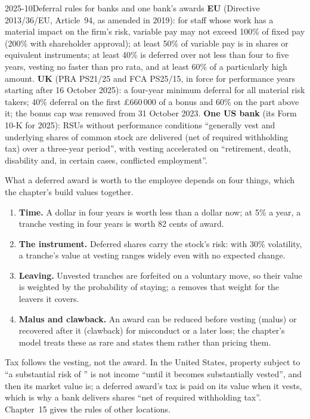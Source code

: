 \begin{dated}{2025-10}{Deferral rules for banks and one bank's awards}\label{dat:in:how-pay-works:rules}
\textbf{EU} (Directive 2013/36/EU, Article~94, as amended in 2019): for staff whose work has a material impact on the
firm's risk, variable pay may not exceed 100\% of fixed pay (200\% with shareholder approval); at least 50\% of variable
pay is in shares or equivalent instruments; at least 40\% is deferred over not less than four to five years, vesting no
faster than pro rata, and at least 60\% of a particularly high amount. \textbf{UK} (PRA PS21/25 and FCA PS25/15,
in force for performance years starting after 16 October 2025): a four-year minimum deferral for all material risk
takers; 40\% deferral on the first \pounds660\,000 of a bonus and 60\% on the part above it; the bonus cap was removed
from 31 October 2023. \textbf{One US bank} (its Form 10-K for 2025): RSUs without performance conditions ``generally vest
and underlying shares of common stock are delivered (net of required withholding tax) over a three-year period'', with
vesting accelerated on ``retirement, death, disability and, in certain cases, conflicted employment''.
\end{dated}

What a deferred award is worth to the employee depends on four things, which the chapter's build values together.
\begin{enumerate}
\item \textbf{Time.} A dollar in four years is worth less than a dollar now; at 5\% a year, a tranche vesting in four
years is worth 82 cents of award.
\item \textbf{The instrument.} Deferred shares carry the stock's risk: with 30\% volatility, a tranche's value at
vesting ranges widely even with no expected change.
\item \textbf{Leaving.} Unvested tranches are forfeited on a voluntary move, so their value is weighted by the
probability of staying; a  removes that weight for the leavers it covers.
\item \textbf{Malus and clawback.} An award can be reduced before vesting (malus) or recovered after it (clawback) for
misconduct or a later loss; the chapter's model treats these as rare and states them rather than pricing them.
\end{enumerate}
Tax follows the vesting, not the award. In the United States, property subject to ``a substantial risk of ''
is not income ``until it becomes substantially vested'', and then its market value is; a deferred award's tax is paid
on its value when it vests, which is why a bank delivers shares ``net of required withholding tax''. Chapter~15 gives the
rules of other locations.

